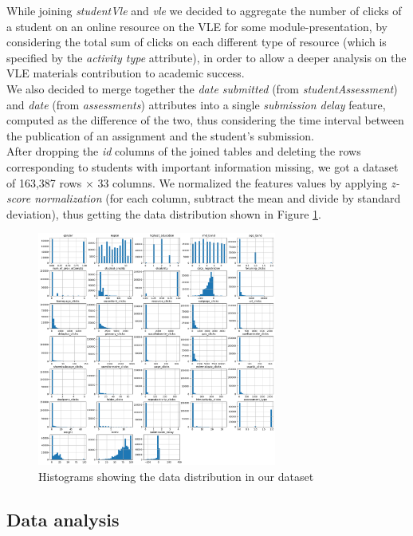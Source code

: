 \documentclass{article}
\begin{document}
While joining \textit{studentVle} and \textit{vle} we decided to aggregate the number of clicks of a student on an online resource on the VLE for some module-presentation, by considering the total sum of clicks on each different type of resource (which is specified by the \textit{activity type} attribute), in order to allow a deeper analysis on the VLE materials contribution to academic success.\\

We also decided to merge together the \textit{date submitted} (from \textit{studentAssessment}) and \textit{date} (from \textit{assessments}) attributes into a single \textit{submission delay} feature, computed as the difference of the two, thus considering the time interval between the publication of an assignment and the  student's submission.\\

After dropping the \textit{id} columns of the joined tables and deleting the rows corresponding to students with important information missing, we got a dataset of 163,387 rows × 33 columns. We normalized the features values by applying \textit{z-score normalization} (for each column, subtract the mean and divide by standard deviation), thus getting the data distribution shown in Figure \ref{fig:distr}.\\


\begin{figure}[h!]
\centering
\includegraphics[width=0.7\textwidth]{data_distribution.png}
\caption{\label{fig:distr}Histograms showing the data distribution in our dataset}
\end{figure}

\subsection{Data analysis}
\end{document}
